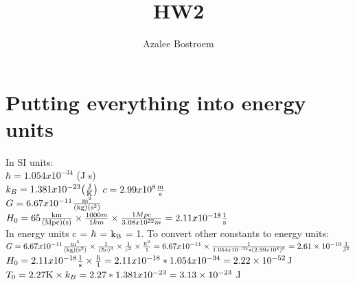 \documentclass[11pt, oneside, doublespacing]{article}   	%
\title{HW2}
\author{Azalee Bostroem}
\begin{document}
\maketitle
\section*{Putting everything into energy units}
In SI units: \\
$\hbar = 1.054x10^{-34}$ (J s) \\
$k_B = 1.381x10^{-23} {\rm\left(\frac{J}{K}\right)} $
$c = 2.99x10^{8} {\rm \frac{m}{s}}$ \\
$G = 6.67x10^{-11} {\rm \frac{m^3}{(kg)(s^2)}}$ \\
$H_{0} = 65 {\rm \frac{km}{(Mpc)(s)}} \times \frac{1000m}{1km} \times\frac{1Mpc}{3.08x10^{22}m} = 2.11x10^{-18}{\rm \frac{1}{s}}$ \\

\noindent  In energy units c = ${\rm \hbar}$ = ${\rm k_{B}}$ = 1. To convert other constants to energy units: \\
$G = 6.67x10^{-11} {\rm \frac{m^3}{(kg)(s^2)}}\times \frac{1}{(\hbar c)^3} \times \frac{1}{c^2} \times \frac{\hbar ^2}{1} = 6.67x10^{-11} \times \frac{1}{1.054x10^{-34} * (2.99x10^{8})^5} = 2.61\times10^{-19}{\rm{\frac{1}{J^{2}}}}$  \\
$H_{0} = 2.11x10^{-18}{\rm \frac{1}{s}} \times \frac{\hbar}{1} = 2.11x10^{-18} * 1.054x10^{-34}  = 2.22 \times 10^{-52} $J  \\
$T_{0} = 2.27 {\rm K} \times k_{B} = 2.27 * 1.381x10^{-23} = 3.13 \times 10^{-23} $ J \\

\end{document}
